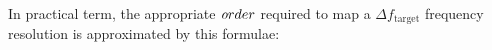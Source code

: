 \documentclass[11pt,a4paper]{ivoa}
\begin{document}
%
%
%
%

In practical term, the appropriate ${\textit order}$ required to map a $ {\Delta f_\text{target}}$ frequency resolution is approximated  by this formulae:\\
\medskip
\noindent{}
\medskip
\end{document}
